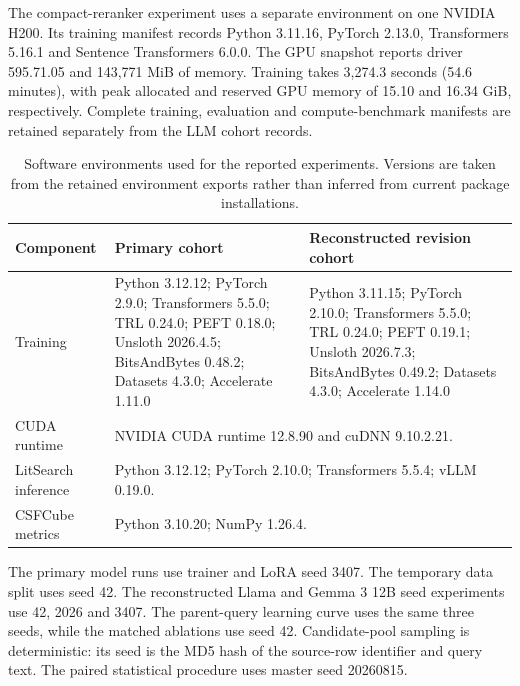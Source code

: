 \documentclass[pdflatex,sn-basic,Numbered]{sn-jnl}%
\theoremstyle{thmstyleone}%
\theoremstyle{thmstyletwo}%
\theoremstyle{thmstylethree}%
\begin{document}
The compact-reranker experiment uses a separate environment on one NVIDIA H200.
Its training manifest records Python 3.11.16, PyTorch 2.13.0,
Transformers 5.16.1 and Sentence Transformers 6.0.0. The GPU snapshot reports
driver 595.71.05 and 143,771 MiB of memory. Training takes 3,274.3 seconds
(54.6 minutes), with peak allocated and reserved GPU memory of 15.10 and
16.34 GiB, respectively. Complete training, evaluation and compute-benchmark
manifests are retained separately from the LLM cohort records.

\begin{table}[t]


\centering
\scriptsize
\setlength{\tabcolsep}{4pt}
\renewcommand{\arraystretch}{1.08}
\begin{tabularx}{\textwidth}{p{} X X}
\hline
Component & Primary cohort & Reconstructed revision cohort \\
\hline
Training & Python 3.12.12; PyTorch 2.9.0; Transformers 5.5.0; TRL 0.24.0; PEFT 0.18.0; Unsloth 2026.4.5; BitsAndBytes 0.48.2; Datasets 4.3.0; Accelerate 1.11.0 & Python 3.11.15; PyTorch 2.10.0; Transformers 5.5.0; TRL 0.24.0; PEFT 0.19.1; Unsloth 2026.7.3; BitsAndBytes 0.49.2; Datasets 4.3.0; Accelerate 1.14.0 \\
CUDA runtime & \multicolumn{2}{p{0.77\textwidth}}{NVIDIA CUDA runtime 12.8.90 and cuDNN 9.10.2.21.} \\
LitSearch inference & \multicolumn{2}{p{0.77\textwidth}}{Python 3.12.12; PyTorch 2.10.0; Transformers 5.5.4; vLLM 0.19.0.} \\
CSFCube metrics & \multicolumn{2}{p{0.77\textwidth}}{Python 3.10.20; NumPy 1.26.4.} \\
\hline
\end{tabularx}


\caption{Software environments used for the reported experiments. Versions are
taken from the retained environment exports rather than inferred from current
package installations.}
\label{tab:software-environments}
\end{table}

The primary model runs use trainer and LoRA seed 3407. The temporary data split
uses seed 42. The reconstructed Llama and Gemma 3 12B seed experiments use 42,
2026 and 3407. The parent-query learning curve uses the same three seeds, while
the matched ablations use seed 42. Candidate-pool sampling is deterministic: its
seed is the MD5 hash of the source-row identifier and query text. The paired
statistical procedure uses master seed 20260815.
\end{document}
